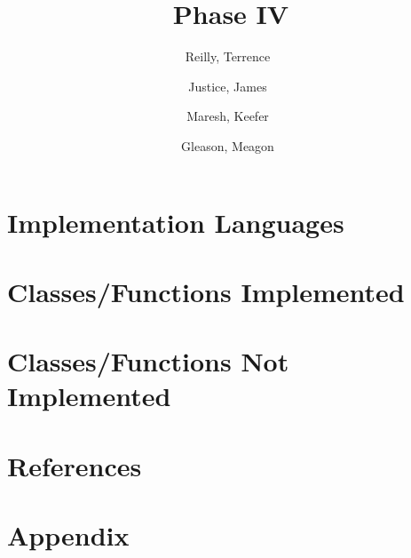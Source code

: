 \documentclass[a4paper,12pt]{article}
\author{%
    Reilly, Terrence\
    \and
    Justice, James\
    \and
    Maresh, Keefer\
    \and
    Gleason, Meagon\
}
\title{Phase IV}
\begin{document}
    \maketitle

    \section*{Implementation Languages}
        

    \section*{Classes/Functions Implemented}
        

    \section*{Classes/Functions Not Implemented}
        

    \section*{References}
        

    \section*{Appendix}
        
\end{document}
